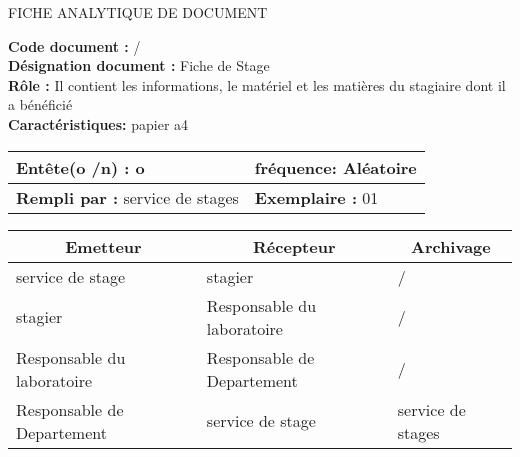 

\newpage

\begin{center}
\Huge FICHE ANALYTIQUE DE DOCUMENT
\end{center}

\vspace{0.5cm}
    

\begin{flushleft}
\textbf{Code document :} / \\
\textbf{Désignation document :} Fiche de Stage \\
\textbf{Rôle :} Il contient les informations, le matériel et les matières du stagiaire dont il a bénéficié \\
\textbf{Caractéristiques:} papier a4\\
\end{flushleft}

\vspace{1cm}

\begin{table}[ht]
\begin{tabularx}{\textwidth}{|X|X|}

\hline
\textbf{Entête(o /n) :}  o   & \textbf{fréquence:} Aléatoire  \\
\hline
\textbf{Rempli par :}  service de stages    & \textbf{Exemplaire :} 01  \\
\hline
\end{tabularx}
\end{table}

\vspace{1cm}

\begin{table}[ht]
\begin{tabularx}{\textwidth}{|X|X|X|}
  \hline
  \multicolumn{1}{|c|}{\centering\textbf{Emetteur}} & \multicolumn{1}{c|}{\centering\textbf{Récepteur}} & \multicolumn{1}{c|}{\centering\textbf{Archivage}} \\
  \hline
  service de stage & stagier  & / \\
  \hline
  stagier & Responsable du laboratoire  & / \\
  \hline
  Responsable du laboratoire & Responsable de Departement & / \\
  \hline
  Responsable de Departement & service de stage  & service de stages \\
  \hline
\end{tabularx}
\end{table}

\vspace{1cm}


